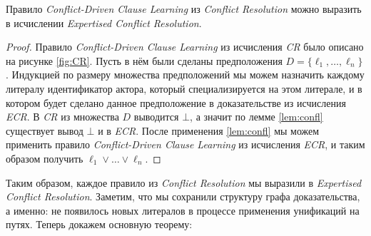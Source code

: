 \begin{lemma}
\label{lem:cdcl}
Правило \emph{Conflict-Driven Clause Learning} из \emph{Conflict Resolution} можно выразить в исчислении \emph{Expertised Conflict Resolution}.
\end{lemma}
\begin{proof}
Правило \emph{Conflict-Driven Clause Learning} из исчисления \emph{CR} было описано на рисунке \ref{fig:CR}. Пусть в нём были сделаны предположения $D = \{\ell_1, \ldots, \ell_n\}$. Индукцией по размеру множества предположений мы можем назначить каждому литералу идентификатор актора, который специализируется на этом литерале, и в котором будет сделано данное предположение в доказательстве из исчисления \emph{ECR}. В \emph{CR} из множества $D$ выводится $\bot$, а значит по лемме \ref{lem:confl} существует вывод $\bot$ и в \emph{ECR}. После применения \ref{lem:confl} мы можем применить правило \emph{Conflict-Driven Clause Learning} из исчисления \emph{ECR}, и таким образом получить $\ell_1 \vee \ldots \vee \ell_n$.
\end{proof}

Таким образом, каждое правило из \emph{Conflict Resolution} мы выразили в \emph{Expertised Conflict Resolution}. Заметим, что мы сохранили структуру графа доказательства, а именно: не появилось новых литералов в процессе применения унификаций на путях. Теперь докажем основную теорему:

